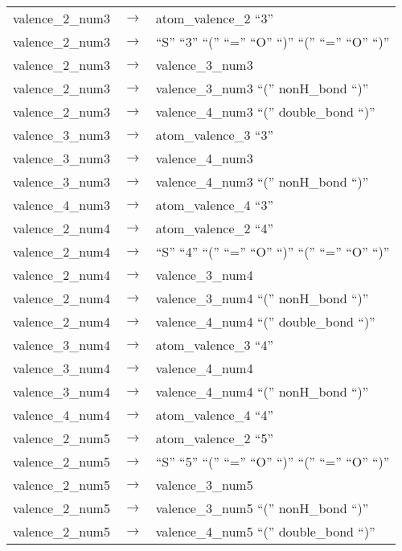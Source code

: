 \documentclass[../Document.tex]{subfiles}
\begin{document}
\begin{longtable}{m{} p{} p{}}
    valence\_2\_num3 & $\rightarrow$ & atom\_valence\_2 ``3'' \\
    valence\_2\_num3 & $\rightarrow$ & ``S'' ``3'' ``('' ``='' ``O'' ``)'' ``('' ``='' ``O'' ``)'' \\
    valence\_2\_num3 & $\rightarrow$ & valence\_3\_num3 \\
    valence\_2\_num3 & $\rightarrow$ & valence\_3\_num3 ``('' nonH\_bond ``)'' \\
    valence\_2\_num3 & $\rightarrow$ & valence\_4\_num3 ``('' double\_bond ``)'' \\
    valence\_3\_num3 & $\rightarrow$ & atom\_valence\_3 ``3'' \\
    valence\_3\_num3 & $\rightarrow$ & valence\_4\_num3 \\
    valence\_3\_num3 & $\rightarrow$ & valence\_4\_num3 ``('' nonH\_bond ``)'' \\
    valence\_4\_num3 & $\rightarrow$ & atom\_valence\_4 ``3'' \\
    valence\_2\_num4 & $\rightarrow$ & atom\_valence\_2 ``4'' \\
    valence\_2\_num4 & $\rightarrow$ & ``S'' ``4'' ``('' ``='' ``O'' ``)'' ``('' ``='' ``O'' ``)'' \\
    valence\_2\_num4 & $\rightarrow$ & valence\_3\_num4 \\
    valence\_2\_num4 & $\rightarrow$ & valence\_3\_num4 ``('' nonH\_bond ``)'' \\
    valence\_2\_num4 & $\rightarrow$ & valence\_4\_num4 ``('' double\_bond ``)'' \\
    valence\_3\_num4 & $\rightarrow$ & atom\_valence\_3 ``4'' \\
    valence\_3\_num4 & $\rightarrow$ & valence\_4\_num4 \\
    valence\_3\_num4 & $\rightarrow$ & valence\_4\_num4 ``('' nonH\_bond ``)'' \\
    valence\_4\_num4 & $\rightarrow$ & atom\_valence\_4 ``4'' \\
    valence\_2\_num5 & $\rightarrow$ & atom\_valence\_2 ``5'' \\
    valence\_2\_num5 & $\rightarrow$ & ``S'' ``5'' ``('' ``='' ``O'' ``)'' ``('' ``='' ``O'' ``)'' \\
    valence\_2\_num5 & $\rightarrow$ & valence\_3\_num5 \\
    valence\_2\_num5 & $\rightarrow$ & valence\_3\_num5 ``('' nonH\_bond ``)'' \\
    valence\_2\_num5 & $\rightarrow$ & valence\_4\_num5 ``('' double\_bond ``)'' \\

\end{longtable}
\end{document}
